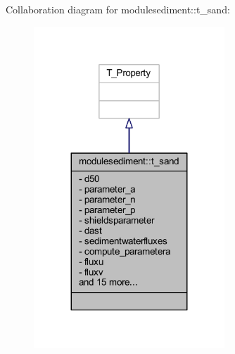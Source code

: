 Collaboration diagram for modulesediment\+:\+:t\+\_\+sand\+:\nopagebreak
\begin{figure}[H]
\begin{center}
\leavevmode
\includegraphics[width=203pt]{structmodulesediment_1_1t__sand__coll__graph}
\end{center}
\end{figure}
